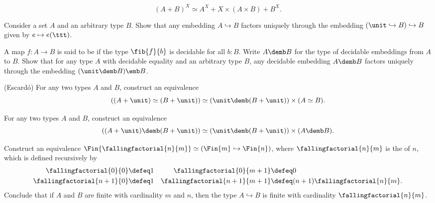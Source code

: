 \begin{exercises}
\begin{equation*}
    (A+B)^X\simeq A^X+X\times (A\times B)+B^X.
  \end{equation*}
  \exitem
  \begin{subexenum}
  \item Consider a set $A$ and an arbitrary type $B$. Show that any embedding $A\hookrightarrow B$ factors uniquely through the embedding $(\unit\hookrightarrow B)\hookrightarrow B$ given by $e\mapsto e(\ttt)$. 
  \item A map $f:A\to B$ is said to be  if the type $\fib{f}{b}$ is decidable for all $b:B$. Write $A\demb B$ for the type of decidable embeddings from $A$ to $B$. Show that for any type $A$ with decidable equality and an arbitrary type $B$, any decidable embedding $A\demb B$ factors uniquely through the embedding $(\unit\demb B)\emb B$.
  \item (Escard\'o) For any two types $A$ and $B$, construct an equivalence
  \begin{equation*}
    ((A+\unit)\simeq(B+\unit))\simeq (\unit\demb (B+\unit))\times(A\simeq B).
  \end{equation*}
  \end{subexenum}
  \exitem
  \begin{subexenum}
  \item For any two types $A$ and $B$, construct an equivalence
    \begin{equation*}
      ((A+\unit)\demb(B+\unit))\simeq (\unit \demb (B+\unit))\times (A\demb B).
    \end{equation*}
  \item Construct an equivalence $\Fin{\fallingfactorial{n}{m}}\simeq(\Fin{m}\hookrightarrow\Fin{n})$, where $\fallingfactorial{n}{m}$ is the  of $n$, which is defined recursively by
    \begin{align*}
      \fallingfactorial{0}{0} & \defeq 1 & \fallingfactorial{0}{m+1} & \defeq 0 \\*
      \fallingfactorial{n+1}{0} & \defeq 1 & \fallingfactorial{n+1}{m+1} & \defeq (n+1)\fallingfactorial{n}{m}.
    \end{align*}
    Conclude that if $A$ and $B$ are finite with cardinality $m$ and $n$, then the type $A\hookrightarrow B$ is finite with cardinality $\fallingfactorial{n}{m}$.
  \end{subexenum}
  \exitem

\end{exercises}
